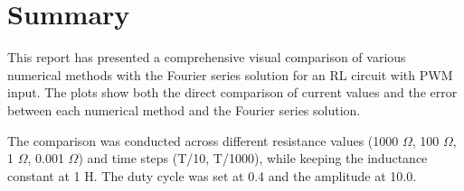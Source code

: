 \documentclass[12pt]{article}
\begin{document}
\section{Summary}

This report has presented a comprehensive visual comparison of various numerical methods with the Fourier series solution for an RL circuit with PWM input. The plots show both the direct comparison of current values and the error between each numerical method and the Fourier series solution.

The comparison was conducted across different resistance values (1000 $\Omega$, 100 $\Omega$, 1 $\Omega$, 0.001 $\Omega$) and time steps (T/10, T/1000), while keeping the inductance constant at 1 H. The duty cycle was set at 0.4 and the amplitude at 10.0.
\end{document}
